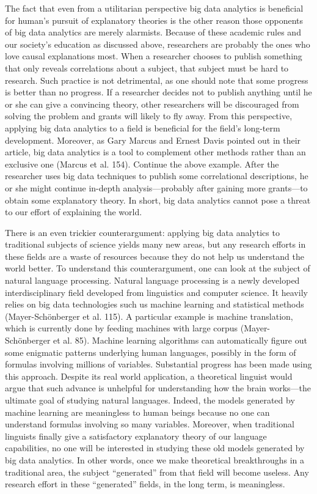\documentclass{writing}
\begin{document}
The fact that even from a utilitarian perspective big data analytics is
beneficial for human's pursuit of explanatory theories is the other
reason those opponents of big data analytics are merely alarmists.
Because of these academic rules and our society's education as discussed
above, researchers are probably the ones who love causal explanations
most. When a researcher chooses to publish something that only reveals
correlations about a subject, that subject must be hard to research.
Such practice is not detrimental, as one should note that some progress
is better than no progress. If a researcher decides not to publish
anything until he or she can give a convincing theory, other researchers
will be discouraged from solving the problem and grants will likely to
fly away. From this perspective, applying big data analytics to a field
is beneficial for the field's long-term development. Moreover, as Gary
Marcus and Ernest Davis pointed out in their article, big data analytics
is a tool to complement other methods rather than an exclusive one
(Marcus et al. 154). Continue the above example. After the researcher
uses big data techniques to publish some correlational descriptions, he
or she might continue in-depth analysis---probably after gaining more
grants---to obtain some explanatory theory. In short, big data analytics
cannot pose a threat to our effort of explaining the world.

There is an even trickier counterargument: applying big data analytics
to traditional subjects of science yields many new areas, but any
research efforts in these fields are a waste of resources because they
do not help us understand the world better. To understand this
counterargument, one can look at the subject of natural language
processing. Natural language processing is a newly developed
interdisciplinary field developed from linguistics and computer science.
It heavily relies on big data technologies such us machine learning and
statistical methods (Mayer-Schönberger et al. 115). A particular example
is machine translation, which is currently done by feeding machines with
large corpus (Mayer-Schönberger et al. 85). Machine learning algorithms
can automatically figure out some enigmatic patterns underlying human
languages, possibly in the form of formulas involving millions of
variables. Substantial progress has been made using this approach.
Despite its real world application, a theoretical linguist would argue
that such advance is unhelpful for understanding how the brain
works---the ultimate goal of studying natural languages. Indeed, the
models generated by machine learning are meaningless to human beings
because no one can understand formulas involving so many variables.
Moreover, when traditional linguists finally give a satisfactory
explanatory theory of our language capabilities, no one will be
interested in studying these old models generated by big data analytics.
In other words, once we make theoretical breakthroughs in a traditional
area, the subject ``generated'' from that field will become useless. Any
research effort in these ``generated'' fields, in the long term, is
meaningless.
\end{document}
